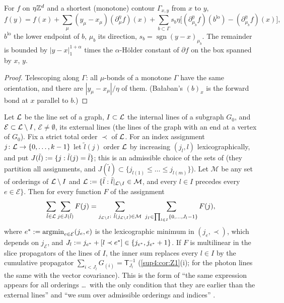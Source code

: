 \begin{lemma}\label{sup4:lem:S213}
For $f$ on $\eta\mathbb Z^d$ and a shortest (monotone) contour $\Gamma_{x,y}$ from $x$ to $y$,
\[
f(y)=f(x)+\sum_\mu(y_\mu-x_\mu)(\partial^\eta_\mu f)(x)+\sum_{b\subset\Gamma}s_b\eta\big[(\partial^\eta_{\mu_b}f)(b^{\mathrm{lo}})-(\partial^\eta_{\mu_b}f)(x)\big],
\]
$b^{\mathrm{lo}}$ the lower endpoint of $b$, $\mu_b$ its direction, $s_b=\operatorname{sgn}(y-x)_{\mu_b}$. The remainder is bounded by $|y-x|_1^{1+\alpha}$ times the $\alpha$-H\"older constant of $\partial f$ on the box spanned by $x$, $y$.
\end{lemma}

\begin{proof}
Telescoping along $\Gamma$: all $\mu$-bonds of a monotone $\Gamma$ have the same orientation, and there are $|y_\mu-x_\mu|/\eta$ of them. (Ba{\l}aban's $(b)_x$ is the forward bond at $x$ parallel to $b$.)
\end{proof}

\begin{lemma}\label{sup4:lem:S214}
Let $\mathcal L$ be the line set of a graph, $I\subset\mathcal L$ the internal lines of a subgraph $G_0$, and $\mathcal E\subset\mathcal L\setminus I$, $\mathcal E\ne\emptyset$, its external lines (the lines of the graph with an end at a vertex of $G_0$). Fix a strict total order $\prec$ of $\mathcal L$. For an index assignment $j\colon\mathcal L\to\{0,\dots,k-1\}$ let $\tilde l(j)$ order $\mathcal L$ by increasing $(j_l,l)$ lexicographically, and put $J(\tilde l):=\{j:\tilde l(j)=\tilde l\}$; this is an admissible choice of the sets of \cite[(2.7)]{Ba3} (they partition all assignments, and $J(\tilde l)\subset\{j_{l(1)}\le\dots\le j_{l(m)}\}$). Let $\mathcal M$ be any set of orderings of $\mathcal L\setminus I$ and $\mathcal L:=\{\tilde l:\tilde l|_{\mathcal L\setminus I}\in\mathcal M$, and every $l\in I$ precedes every $e\in\mathcal E\}$. Then for every function $F$ of the assignment
\[
\sum_{\tilde l\in\mathcal L}\sum_{j\in J(\tilde l)}F(j)=\sum_{j_{\mathcal L\setminus I}:\ \tilde l(j_{\mathcal L\setminus I})\in\mathcal M}\ \sum_{j_I\in\prod_{l\in I}\{0,\dots,J_l-1\}}F(j),
\]
where $e^*:=\operatorname{argmin}_{e\in\mathcal E}(j_e,e)$ is the lexicographic minimum in $(j_e,\prec)$, which depends on $j_{\mathcal E}$, and $J_l:= j_{e^*}+[l\prec e^*]\in\{j_{e^*},j_{e^*}+1\}$. If $F$ is multilinear in the slice propagators of the lines of $I$, the inner sum replaces every $l\in I$ by the cumulative propagator $\sum_{i<J_l}G_{(i)}=\mathsf T_{J_l}^{-1}$ (\cref{sup4:cor:Z1}(i); for the photon lines the same with the vector covariance). This is the form of ``the same expression appears for all orderings \dots\ with the only condition that they are earlier than the external lines'' \cite[p.~437]{Ba3} and ``we sum over admissible orderings and indices'' \cite[p.~444]{Ba3}.
\end{lemma}

